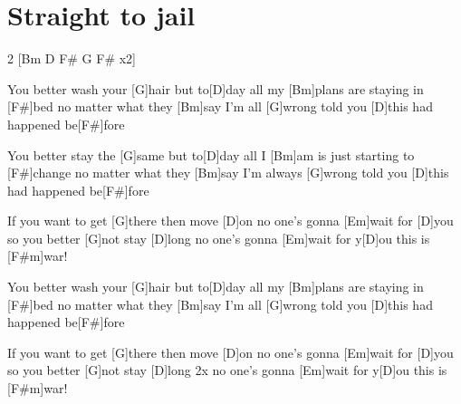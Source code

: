 \section{Straight to jail}
\begin{guitar}
\begin{multicols}{2}
[Bm  D  F#  G  F# x2]{}


You better wash your [G]hair
but to[D]day all my [Bm]plans are staying in [F#]bed
no matter what they [Bm]say
I'm all [G]wrong
told you [D]this had happened be[F#]fore


You better stay the [G]same
but to[D]day all I [Bm]am is just starting to [F#]change
no matter what they [Bm]say
I'm always [G]wrong
told you [D]this had happened be[F#]fore


If you want to get [G]there
then move [D]on
no one's gonna [Em]wait for [D]you
so you better [G]not stay [D]long
no one's gonna [Em]wait for y[D]ou
this is [F#m]war!


You better wash your [G]hair
but to[D]day all my [Bm]plans are staying in [F#]bed
no matter what they [Bm]say
I'm all [G]wrong
told you [D]this had happened be[F#]fore


If you want to get [G]there
then move [D]on
no one's gonna [Em]wait for [D]you
so you better [G]not stay [D]long \hspace{2cm}2x
no one's gonna [Em]wait for y[D]ou
this is [F#m]war!
\end{multicols}
\end{guitar}
